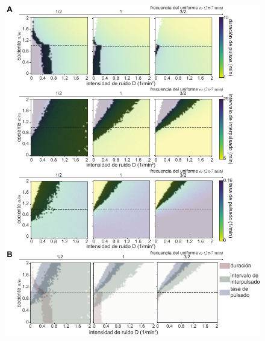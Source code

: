 \documentclass[./main.tex]{subfiles}
\begin{document}
 \begin{figure}
    \centering
    \includegraphics[width=1\columnwidth]{figures/chapter6/C6_2d_plots_superposition.pdf} 

\end{figure}
\end{document}
